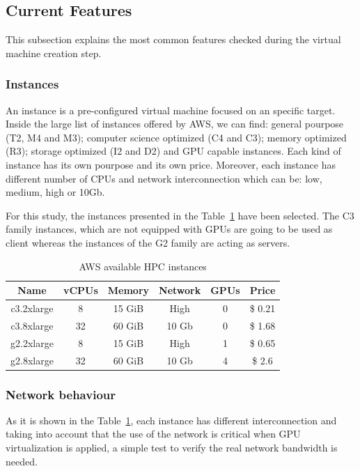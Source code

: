 \documentclass[a4paper,twoside]{article}
\begin{document}
\subsection{Current Features}
This subsection explains the most common features checked during 
the virtual machine creation step.

\subsubsection{Instances}

An instance is a pre-configured virtual machine focused on an 
specific target. Inside the large list of instances offered by AWS, 
we can find: general pourpose (T2, M4 and M3); computer science optimized 
(C4 and C3); memory optimized (R3); storage optimized (I2 and D2) and 
GPU capable instances. Each kind of instance has its own pourpose and its 
own price. Moreover, each instance has different number of CPUs and network 
interconnection which can be: low, medium, high or 10Gb.

For this study, the instances presented in the Table~\ref{table:awsInstances} 
have been selected. The C3 family instances, which are not equipped with 
GPUs are going to be used as client whereas the instances of the G2 family are 
acting as servers.   

\begin{table}[htb]
\renewcommand{\arraystretch}{1.3}
\caption{AWS available HPC instances}
\label{table:awsInstances}
\tabcolsep=0.09cm
\begin{center}\begin{tabular}{cccccc}
Name & vCPUs & Memory & Network & GPUs & Price\\ \hline \hline
c3.2xlarge & 8 & 15 GiB & High & 0 & \$ 0.21\\ \hline
c3.8xlarge & 32 & 60 GiB & 10 Gb & 0 & \$ 1.68 \\ \hline
g2.2xlarge & 8 & 15 GiB & High & 1 & \$ 0.65\\ \hline
g2.8xlarge & 32 & 60 GiB & 10 Gb & 4 & \$ 2.6 \\ \hline
\end{tabular}\end{center}\end{table}

\subsubsection{Network behaviour}
As it is shown in the Table~\ref{table:awsInstances}, each instance has different 
interconnection and taking into account that the use of the network 
is critical when GPU virtualization is applied, a simple test to verify the 
real network bandwidth is needed.
\end{document}
